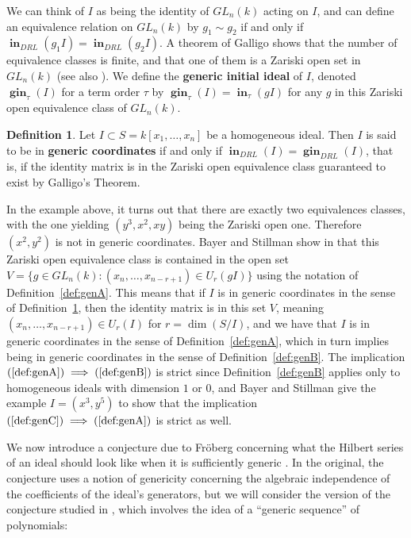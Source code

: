 \documentclass[11pt]{article}
\DeclareMathOperator{\Init}{\mathbf{in}}
\DeclareMathOperator{\gin}{\mathbf{gin}}
\theoremstyle{definition}
\newtheorem{definition}{Definition}
\begin{document}
We can think of $I$ as being the identity of $GL_n(k)$ acting on $I$, and can define an equivalence relation on $GL_n(k)$ by $g_1 \sim g_2$ if and only if $\Init_{DRL}(g_1 I) = \Init_{DRL}(g_2 I)$. A theorem of Galligo \cite{galligo1974propos} shows that the number of equivalence classes is finite, and that one of them is a Zariski open set in $GL_n(k)$ (see also \cite{miller2005combinatorial}). We define the \textbf{generic initial ideal} of $I$, denoted $\gin_{\tau}(I)$ for a term order $\tau$ by $\gin_\tau(I) = \Init_\tau(gI)$ for any $g$ in this Zariski open equivalence class of $GL_n(k)$. 


\begin{definition}\label{def:genC}
	Let $I \subset S = k[x_1, \dots, x_n]$ be a homogeneous ideal. Then $I$ is said to be in \textbf{generic coordinates} if and only if $\Init_{DRL}(I) = \gin_{DRL}(I)$, that is, if the identity matrix is in the Zariski open equivalence class guaranteed to exist by Galligo's Theorem. 
\end{definition} 


In the example above, it turns out that there are exactly two equivalences classes, with the one yielding $(y^3, x^2, xy)$ being the Zariski open one. Therefore $(x^2,y^2)$ is not in generic coordinates. Bayer and Stillman show in \cite{bayer1987criterion} that this Zariski open equivalence class is contained in the open set $V = \{g \in GL_n(k) : (x_n, \dots, x_{n - r + 1}) \in U_r(gI)\}$ using the notation of Definition~\ref{def:genA}. This means that if $I$ is in generic coordinates in the sense of Definition~\ref{def:genC}, then the identity matrix is in this set $V$, meaning $(x_n, \dots, x_{n - r + 1}) \in U_r(I)$ for $r = \dim(S/I)$, and we have that $I$ is in generic coordinates in the sense of Definition~\ref{def:genA}, which in turn implies being in generic coordinates in the sense of Definition~\ref{def:genB}. The implication $(\ref{def:genA}) \implies (\ref{def:genB})$ is strict since Definition~\ref{def:genB} applies only to homogeneous ideals with dimension $1$ or $0$, and Bayer and Stillman give the example $I = (x^3, y^5)$ to show that the implication $(\ref{def:genC}) \implies (\ref{def:genA})$ is strict as well. 

We now introduce a conjecture due to Fröberg concerning what the Hilbert series of an ideal should look like when it is sufficiently generic \cite{froberg1985inequality}. In the original, the conjecture uses a notion of genericity concerning the algebraic independence of the coefficients of the ideal's generators, but we will consider the version of the conjecture studied in \cite{pardue2010generic}, which involves the idea of a ``generic sequence'' of polynomials: 
\end{document}
